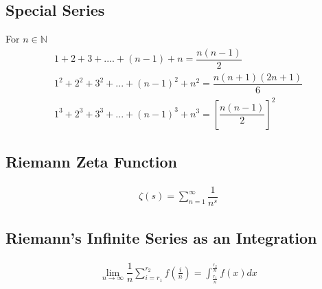 \documentclass[../main.tex]{subfiles}
\begin{document}
	
	\begin{strip}
		\section{Special Series}
		For $n\in\mathbb{N}$
		\begin{align}
			1+2+3+....+(n-1)+n=\dfrac{n(n-1)}{2}\\
			1^2+2^2+3^2+...+(n-1)^2+n^2=\dfrac{n(n+1)(2n+1)}{6}\\
			1^3+2^3+3^3+...+(n-1)^3+n^3=[\dfrac{n(n-1)}{2}]^2
		\end{align}
	\end{strip}

	\subsection{Riemann Zeta Function}
	\begin{align}
		\zeta(s)=\sum_{n=1}^\infty \dfrac{1}{n^s}
	\end{align}

	\subsection{Riemann's Infinite Series as an Integration}
	\label{riemannsum}
	\begin{align}
		\lim_{n\to\infty} \dfrac{1}{n}\sum_{i=r_1}^{r_2} f(\frac{i}{n}) = \displaystyle\int_{\frac{r_1}{n}}^{\frac{r_2}{n}} f(x) dx
	\end{align}
\end{document}
